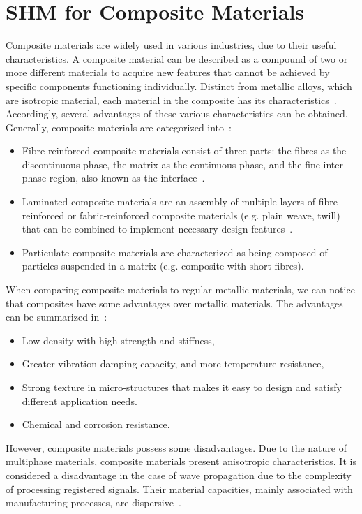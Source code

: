 \section[SHM for Composite Materials]{SHM for Composite Materials}
\label{sec21}
Composite materials are widely used in various industries, due to their useful characteristics. 
A composite material can be described as a compound of two or more different materials to acquire new features that cannot be achieved by specific components functioning individually.
Distinct from metallic alloys, which are isotropic material, each material in the composite has its characteristics~\cite{Campbell2010}.
Accordingly, several advantages of these various characteristics can be obtained. 
Generally, composite materials are categorized into~\cite{Jones1999}:
\begin{itemize}
	\item Fibre-reinforced composite materials consist of three parts: the fibres as the discontinuous phase, the matrix as the continuous phase, and the fine inter-phase region, also known as the interface~\cite{Cantwell1991}.
	\item Laminated composite materials are an assembly of multiple layers of fibre-reinforced or fabric-reinforced composite materials (e.g. plain weave, twill) that can be combined to implement necessary design features~\cite{Ramirez1999}.
	\item Particulate composite materials are characterized as being composed of particles suspended in a matrix (e.g. composite with short fibres).
\end{itemize}

When comparing composite materials to regular metallic materials, we can notice that composites have some advantages over metallic materials. 
The advantages can be summarized in~\cite{Campbell2010}:
\begin{itemize}
	\item Low density with high strength and stiffness,
	\item Greater vibration damping capacity, and more temperature resistance,
	\item Strong texture in micro-structures that makes it easy to design and 
	satisfy different application needs. 
	\item Chemical and corrosion resistance.	
\end{itemize}

However, composite materials possess some disadvantages.
Due to the nature of multiphase materials, composite materials present anisotropic characteristics. 
It is considered a disadvantage in the case of wave propagation due to the complexity of processing registered signals. 
Their material capacities, mainly associated with manufacturing processes, are dispersive~\cite{Awad2012}. 

